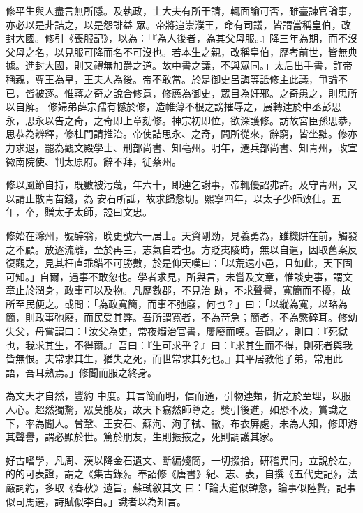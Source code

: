 \begin{pinyinscope}
 修平生與人盡言無所隱。及執政，士大夫有所干請，輒面諭可否，雖臺諫官論事，亦必以是非詰之，以是怨誹益
 眾。帝將追崇濮王，命有司議，皆謂當稱皇伯，改封大國。修引《喪服記》，以為：「『為人後者，為其父母服。』降三年為期，而不沒父母之名，以見服可降而名不可沒也。若本生之親，改稱皇伯，歷考前世，皆無典據。進封大國，則又禮無加爵之道。故中書之議，不與眾同。」太后出手書，許帝稱親，尊王為皇，王夫人為後。帝不敢當。於是御史呂誨等詆修主此議，爭論不已，皆被逐。惟蔣之奇之說合修意，修薦為御史，眾目為奸邪。之奇患之，則思所以自解。
 修婦弟薛宗孺有憾於修，造帷薄不根之謗摧辱之，展轉達於中丞彭思永，思永以告之奇，之奇即上章劾修。神宗初即位，欲深護修。訪故宮臣孫思恭，思恭為辨釋，修杜門請推治。帝使詰思永、之奇，問所從來，辭窮，皆坐黜。修亦力求退，罷為觀文殿學士、刑部尚書、知亳州。明年，遷兵部尚書、知青州，改宣徽南院使、判太原府。辭不拜，徙蔡州。



 修以風節自持，既數被污蔑，年六十，即連乞謝事，帝輒優詔弗許。及守青州，又以請止散青苗錢，為
 安石所詆，故求歸愈切。熙寧四年，以太子少師致仕。五年，卒，贈太子太師，謚曰文忠。



 修始在滁州，號醉翁，晚更號六一居士。天資剛勁，見義勇為，雖機阱在前，觸發之不顧。放逐流離，至於再三，志氣自若也。方貶夷陵時，無以自遣，因取舊案反復觀之，見其枉直乖錯不可勝數，於是仰天嘆曰：「以荒遠小邑，且如此，天下固可知。」自爾，遇事不敢忽也。學者求見，所與言，未嘗及文章，惟談吏事，謂文章止於潤身，政事可以及物。凡歷數郡，不見治
 跡，不求聲譽，寬簡而不擾，故所至民便之。或問：「為政寬簡，而事不弛廢，何也？」曰：「以縱為寬，以略為簡，則政事弛廢，而民受其弊。吾所謂寬者，不為苛急；簡者，不為繁碎耳。修幼失父，母嘗謂曰：「汝父為吏，常夜燭治官書，屢廢而嘆。吾問之，則曰：『死獄也，我求其生，不得爾。』吾曰：『生可求乎？』曰：『求其生而不得，則死者與我皆無恨。夫常求其生，猶失之死，而世常求其死也。』其平居教他子弟，常用此語，吾耳熟焉。」修聞而服之終身。



 為文天才自然，豐約
 中度。其言簡而明，信而通，引物連類，折之於至理，以服人心。超然獨騖，眾莫能及，故天下翕然師尊之。獎引後進，如恐不及，賞識之下，率為聞人。曾鞏、王安石、蘇洵、洵子軾、轍，布衣屏處，未為人知，修即游其聲譽，謂必顯於世。篤於朋友，生則振掖之，死則調護其家。



 好古嗜學，凡周、漢以降金石遺文、斷編殘簡，一切掇拾，研稽異同，立說於左，的的可表證，謂之《集古錄》。奉詔修《唐書》紀、志、表，自撰《五代史記》，法嚴詞約，多取《春秋》遺旨。蘇軾敘其文
 曰：「論大道似韓愈，論事似陸贄，記事似司馬遷，詩賦似李白。」識者以為知言。




\end{pinyinscope}
